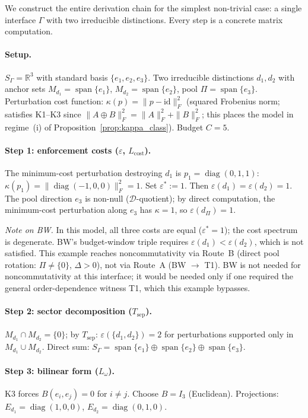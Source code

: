 \documentclass[11pt,a4paper]{article}
\theoremstyle{definition}
\newcommand{\eps}{\varepsilon}
\DeclareMathOperator{\spn}{span}
\DeclareMathOperator{\diag}{diag}
\begin{document}
We construct the entire derivation chain for the simplest non-trivial case: a single interface $\Gamma$ with two irreducible distinctions.  Every step is a concrete matrix computation.

\paragraph{Setup.}
$S_\Gamma = \mathbb{R}^3$ with standard basis $\{e_1, e_2, e_3\}$.  Two irreducible distinctions $d_1, d_2$ with anchor sets $M_{d_1} = \spn\{e_1\}$, $M_{d_2} = \spn\{e_2\}$, pool $\Pi = \spn\{e_3\}$.  Perturbation cost function: $\kappa(p) = \|p - \mathrm{id}\|_F^2$ (squared Frobenius norm; satisfies K1--K3 since $\|A \oplus B\|_F^2 = \|A\|_F^2 + \|B\|_F^2$; this places the model in regime~(i) of Proposition~\ref{prop:kappa_class}).  Budget $C = 5$.

\paragraph{Step 1: enforcement costs ($\eps$, $L_{\mathrm{cost}}$).}
The minimum-cost perturbation destroying $d_1$ is $p_1 = \diag(0,1,1)$: $\kappa(p_1) = \|\diag(-1,0,0)\|_F^2 = 1$.  Set $\eps^* := 1$.  Then $\eps(d_1) = \eps(d_2) = 1$.  The pool direction $e_3$ is non-null ($\mathcal{D}$-quotient); by direct computation, the minimum-cost perturbation along $e_3$ has $\kappa = 1$, so $\eps(d_\Pi) = 1$.

\smallskip\noindent\textit{Note on BW.}  In this model, all three costs are equal ($\eps^* = 1$); the cost spectrum is degenerate.  BW's budget-window triple requires $\eps(d_1) < \eps(d_2)$, which is not satisfied.  This example reaches noncommutativity via Route~B (direct pool rotation: $\Pi \ne \{0\}$, $\Delta > 0$), not via Route~A (BW $\to$ T1).  BW is not needed for noncommutativity at this interface; it would be needed only if one required the general order-dependence witness T1, which this example bypasses.

\paragraph{Step 2: sector decomposition ($T_{\mathrm{sep}}$).}
$M_{d_1} \cap M_{d_2} = \{0\}$; by $T_{\mathrm{sep}}$: $\eps(\{d_1,d_2\}) = 2$ for perturbations supported only in $M_{d_1} \cup M_{d_2}$.  Direct sum: $S_\Gamma = \spn\{e_1\} \oplus \spn\{e_2\} \oplus \spn\{e_3\}$.

\paragraph{Step 3: bilinear form ($L_\omega$).}
K3 forces $B(e_i, e_j) = 0$ for $i \ne j$.  Choose $B = I_3$ (Euclidean).  Projections: $E_{d_1} = \diag(1,0,0)$, $E_{d_2} = \diag(0,1,0)$.
\end{document}
